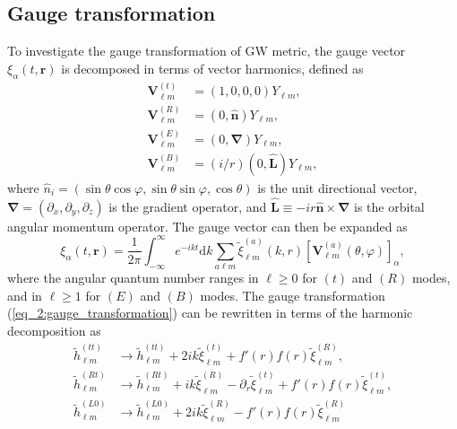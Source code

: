 \documentclass[reprint,amsmath,amssymb,aps,prd]{revtex4-2}
\newcommand{\dd}[0]{\mathrm{d}}
\begin{document}
\begin{widetext}
\section{\label{app:gauge_transformation}Gauge transformation}
To investigate the gauge transformation of GW metric, the gauge vector $\xi_{\alpha}(t,\bm{r})$ is decomposed in terms of vector harmonics, defined as \cite{Maggiore_2018_b}
\begin{subequations}
\begin{align}
\mathbf{V}^{(t)}_{\ell m}
&=(1,0,0,0)Y_{\ell m},\\
\mathbf{V}^{(R)}_{\ell m}
&=(0,\hat{\bm{n}})Y_{\ell m},\\
\mathbf{V}^{(E)}_{\ell m}
&=(0,\bm{\nabla})Y_{\ell m},\\
\mathbf{V}^{(B)}_{\ell m}
&=(i/r)(0,\hat{\bm{L}})Y_{\ell m},
\end{align}
\end{subequations}
where $\hat{n}_{i}=(\sin\theta\cos\varphi,\sin\theta\sin\varphi,\cos\theta)$ is the unit directional vector, $\bm{\nabla}=(\partial_{x},\partial_{y},\partial_{z})$ is the gradient operator, and $\hat{\bm{L}}\equiv-ir\hat{\bm{n}}\times\bm{\nabla}$ is the orbital angular momentum operator. The gauge vector can then be expanded as \cite{Maggiore_2018_b}
\begin{equation}
\xi_{\alpha}(t,\bm{r})
=\frac{1}{2\pi}\int_{-\infty}^{\infty}e^{-ikt}\dd k
\sum_{a\ell m}
\tilde{\xi}^{(a)}_{\ell m}(k,r)
\left[\mathbf{V}_{\ell m}^{(a)}(\theta,\varphi)\right]_{\alpha},
\end{equation}
where the angular quantum number ranges in $\ell\geqslant0$ for $(t)$ and $(R)$ modes, and in $\ell\geqslant1$ for $(E)$ and $(B)$ modes.
The gauge transformation (\ref{eq_2:gauge_transformation}) can be rewritten in terms of the harmonic decomposition as \cite{Maggiore_2018_b}
\begin{subequations}
\label{eq_B:gauge_transformation}
\begin{align}
\tilde{h}_{\ell m}^{(tt)}&\rightarrow\tilde{h}_{\ell m}^{(tt)}
+2ik\tilde{\xi}_{\ell m}^{(t)}
+f'(r)f(r)\tilde{\xi}_{\ell m}^{(R)},\\
\tilde{h}_{\ell m}^{(Rt)}&\rightarrow \tilde{h}_{\ell m}^{(Rt)}
+ik\tilde{\xi}_{\ell m}^{(R)}
-\partial_{r}\tilde{\xi}_{\ell m}^{(t)}+f'(r)f(r)\tilde{\xi}_{\ell m}^{(t)},\\
\tilde{h}_{\ell m}^{(L0)}&\rightarrow \tilde{h}_{\ell m}^{(L0)}
+2ik\tilde{\xi}_{\ell m}^{(R)}
-f'(r)f(r)\tilde{\xi}_{\ell m}^{(R)}\\

\end{align}
\end{subequations}
\end{widetext}
\end{document}
